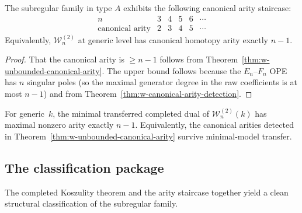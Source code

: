 \begin{corollary}
\label{cor:w-subregular-arity-staircase}
The subregular family in type $A$ exhibits the following canonical
arity staircase:
\[
\begin{array}{c|ccccc}
n & 3 & 4 & 5 & 6 & \cdots \\
\hline
\text{canonical arity} & 2 & 3 & 4 & 5 & \cdots
\end{array}
\]
Equivalently, $\mathcal{W}_n^{(2)}$ at generic level has canonical
homotopy arity exactly $n - 1$.
\end{corollary}

\begin{proof}
That the canonical arity is $\ge n-1$ follows from
Theorem~\ref{thm:w-unbounded-canonical-arity}.  The upper bound
follows because the $E_n$--$F_n$ OPE has $n$ singular
poles (so the maximal generator degree in the raw coefficients is
at most $n-1$) and from
Theorem~\ref{thm:w-canonical-arity-detection}.
\end{proof}

\begin{conjecture}
\label{conj:w-minimal-arity-subregular}
For generic~$k$, the minimal transferred completed dual of
$\mathcal{W}_n^{(2)}(k)$ has maximal nonzero arity exactly $n-1$.
Equivalently, the canonical arities detected in
Theorem~\ref{thm:w-unbounded-canonical-arity} survive minimal-model
transfer.
\end{conjecture}

\subsection{The classification package}
\label{subsec:subregular-classification}

The completed Koszulity theorem and the arity staircase together
yield a clean structural classification of the subregular family.

